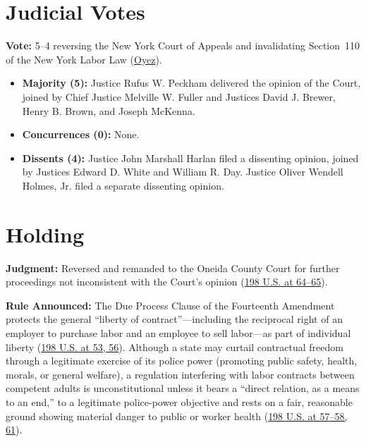 \documentclass[12pt]{article}
\begin{document}
\section{Judicial Votes}

\textbf{Vote:} 5--4 reversing the New York Court of Appeals and invalidating Section~110 of the New York Labor Law (\href{https://www.oyez.org/cases/1900-1940/198us45}{Oyez}).

\begin{itemize}
    \item \textbf{Majority (5):} Justice Rufus W. Peckham delivered the opinion of the Court, joined by Chief Justice Melville W. Fuller and Justices David J. Brewer, Henry B. Brown, and Joseph McKenna.
    \item \textbf{Concurrences (0):} None.
    \item \textbf{Dissents (4):} Justice John Marshall Harlan filed a dissenting opinion, joined by Justices Edward D. White and William R. Day. Justice Oliver Wendell Holmes, Jr. filed a separate dissenting opinion.
\end{itemize}

\section{Holding}

\textbf{Judgment:} Reversed and remanded to the Oneida County Court for further proceedings not inconsistent with the Court's opinion (\href{https://caselaw.findlaw.com/court/us-supreme-court/198/45.html}{198 U.S. at 64--65}).

\textbf{Rule Announced:} The Due Process Clause of the Fourteenth Amendment protects the general ``liberty of contract''---including the reciprocal right of an employer to purchase labor and an employee to sell labor---as part of individual liberty (\href{https://caselaw.findlaw.com/court/us-supreme-court/198/45.html}{198 U.S. at 53, 56}). Although a state may curtail contractual freedom through a legitimate exercise of its police power (promoting public safety, health, morals, or general welfare), a regulation interfering with labor contracts between competent adults is unconstitutional unless it bears a ``direct relation, as a means to an end,'' to a legitimate police-power objective and rests on a fair, reasonable ground showing material danger to public or worker health (\href{https://caselaw.findlaw.com/court/us-supreme-court/198/45.html}{198 U.S. at 57--58, 61}).
\end{document}

